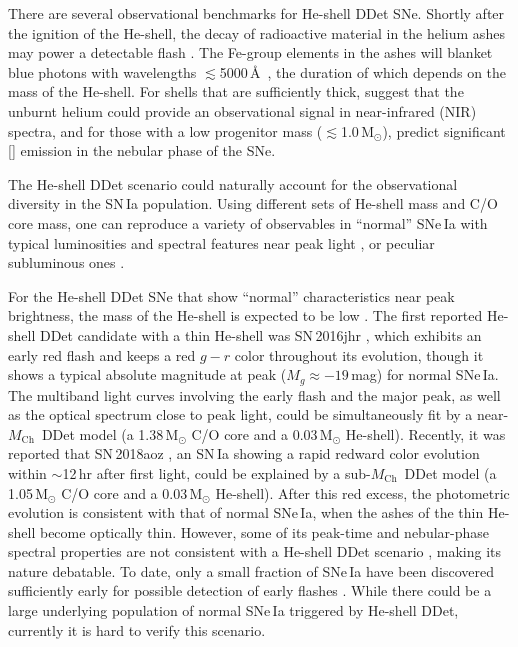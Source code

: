 \documentclass[twocolumn]{aastex631}
\newcommand{\Mch}{$M_\mathrm{Ch}$}
\begin{document}
\begin{CJK*}{UTF8}{gbsn}
There are several observational benchmarks for He-shell DDet SNe. Shortly after the ignition of the He-shell, the decay of radioactive material in the helium ashes may power a detectable flash \citep{Woosley_1994,Fink_DD_2010,Kromer_DD_2010}. The Fe-group elements in the ashes will blanket blue photons with wavelengths $\lesssim$5000\,\AA\ \citep{Kromer_DD_2010}, the duration of which depends on the mass of the He-shell. For shells that are sufficiently thick, \citet{Boyle2017_Helium} suggest that the unburnt helium could provide an observational signal in near-infrared (NIR) spectra, and for those with a low progenitor mass ($\lesssim$1.0\,$\mathrm{M_\odot}$), \citet{polin_nebular_2021} predict significant [] emission in the nebular phase of the SNe.

The He-shell DDet scenario could naturally account for the observational diversity in the SN\,Ia population. Using different sets of He-shell mass and C/O core mass, one can reproduce a variety of observables in ``normal'' SNe\,Ia with typical luminosities and spectral features near peak light \citep[e.g.,][]{polin_observational_2019,Shen_2D_2021}, or peculiar subluminous ones \citep[e.g.,][]{polin_observational_2019}. 

For the He-shell DDet SNe that show ``normal'' characteristics near peak brightness, the mass of the He-shell is expected to be low \citep[$\lesssim$0.03\,$\mathrm{M_\odot}$;][]{Kromer_DD_2010,Sim_2010,Shen_DD_2018,polin_observational_2019,Magee_2021}. The first reported He-shell DDet candidate with a thin He-shell was SN\,2016jhr \citep{jiang_16jhr_2017}, which exhibits an early red flash and keeps a red $g-r$ color throughout its evolution, though it shows a typical absolute magnitude at peak ($M_g\approx-19$\,mag) for normal SNe\,Ia. The multiband light curves involving the early flash and the major peak, as well as the optical spectrum close to peak light, could be simultaneously fit by a near-\Mch\ DDet model (a 1.38\,$\mathrm{M_\odot}$ C/O core and a 0.03\,$\mathrm{M_\odot}$ He-shell). Recently, it was reported that SN\,2018aoz \citep{Ni_2022}, an SN\,Ia showing a rapid redward color evolution within $\sim$12\,hr after first light, could be explained by a sub-\Mch\ DDet model (a 1.05\,$\mathrm{M_\odot}$ C/O core and a 0.03\,$\mathrm{M_\odot}$ He-shell). After this red excess, the photometric evolution is consistent with that of normal SNe\,Ia, when the ashes of the thin He-shell become optically thin. However, some of its peak-time and nebular-phase spectral properties are not consistent with a He-shell DDet scenario \citep{Ni_2022b}, making its nature debatable. To date, only a small fraction of SNe\,Ia have been discovered sufficiently early for possible detection of early flashes \citep[e.g.,][]{Deckers_2022}. While there could be a large underlying population of normal SNe\,Ia triggered by He-shell DDet, currently it is hard to verify this scenario.


\end{CJK*}
\end{document}
